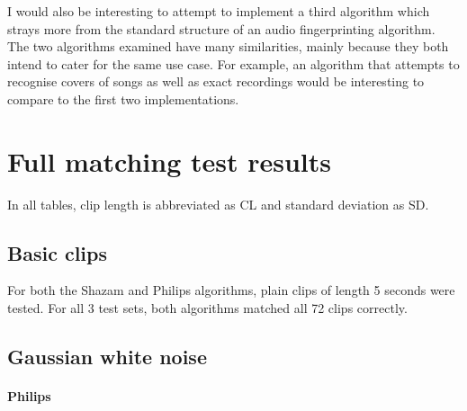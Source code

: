 \documentclass[12pt,a4paper,twoside,openright]{report}
\begin{document}
I would also be interesting to attempt to implement a third algorithm which strays more from the standard structure of an audio fingerprinting algorithm. The two algorithms examined have many similarities, mainly because they both intend to cater for the same use case. For example, an algorithm that attempts to recognise covers of songs as well as exact recordings would be interesting to compare to the first two implementations.





\appendix



\chapter{Full matching test results}

In all tables, clip length is abbreviated as CL and standard deviation as SD.


\section{Basic clips}

For both the Shazam and Philips algorithms, plain clips of length 5 seconds were tested. For all 3 test sets, both algorithms matched all 72 clips correctly.

\section{Gaussian white noise}

\subsubsection{Philips}
\end{document}
